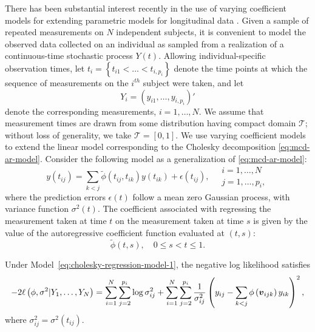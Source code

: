 There has been substantial interest recently in the use of varying coefficient models for extending parametric models for longitudinal data \citep{noh2010sparse,csenturk2013modeling,csenturk2008generalized,chiang2001smoothing,hoover1998nonparametric,fan1999statistical}. Given a sample of repeated measurements on $N$ independent subjects, it is convenient to model the observed data collected on an individual as sampled from a realization of a continuous-time stochastic process $Y\left(t\right)$. Allowing individual-specific observation times, let $t_{i} = \left\{t_{i1} <  \dots < t_{i,p_i}\right\}$ denote the time points at which the sequence of measurements on the $i^{th}$ subject were taken, and let
\[
Y_i = \left(y_{i1}, \dots, y_{i,p_i}\right)'
\]
\noindent
denote the corresponding measurements, $i = 1, \dots, N$. We assume that measurement times are drawn from some distribution having compact domain $\mathcal{T}$; without loss of generality, we take $\mathcal{T} = \left[0,1\right]$. We use varying coefficient models to extend the linear model corresponding to the Cholesky decomposition \eqref{eq:mcd-ar-model}. Consider the following model as a generalization of \eqref{eq:mcd-ar-model}: 
\begin{equation}  \label{eq:cholesky-regression-model-1} 
y\left(t_{ij} \right)  = \sum_{k < j} \tilde{\phi}\left(t_{ij} ,t_{ik}\right) y\left(t_{ik}\right) + \epsilon\left({t_{ij}}\right), \quad \begin{array}{l} i = 1, \dots, N\\ j = 1, \dots, p_i,\end{array}
\end{equation}
\noindent
where the prediction errors $\epsilon\left(t\right)$ follow a mean zero Gaussian process, with variance function $\sigma^2\left(t\right)$. The coefficient associated with regressing the measurement taken at time $t$ on the measurement taken at time $s$ is given by the value of the autoregressive coefficient function evaluated at $\left(t,s\right)$:
\[
\tilde{\phi}\left(t,s\right), \quad 0 \le s < t \le 1.
\]

Under Model~\eqref{eq:cholesky-regression-model-1}, the negative log likelihood satisfies 
\begin{equation} \label{eq:full-joint-likelihood}
-2\ell\left(\phi, \sigma^2 \vert Y_1,\dots, Y_N \right) = \sum_{i=1}^N \sum_{j=2}^{p_i} \log \sigma_{ij}^2+  \sum_{i=1}^N \sum_{j=2}^{p_i} \frac{1}{\sigma^{2}_{ij}}\left( y_{ij} - \sum_{k<j} \phi\left(\mbox{\boldmath $v$}_{ijk}\right) y_{ik}  \right)^2,
\end{equation}
\noindent
where $\sigma_{ij}^2 = \sigma^2\left(t_{ij}\right)$.
\bigskip

